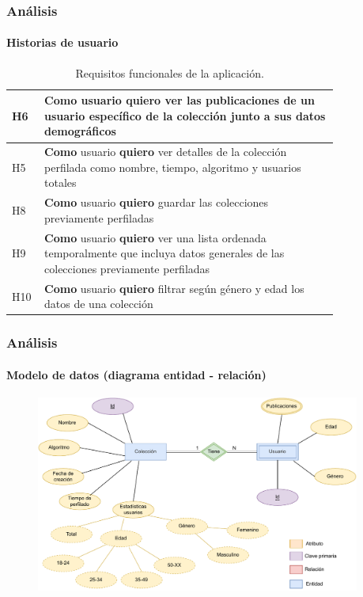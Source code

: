 \documentclass{beamer}
\begin{document}
	\begin{frame}
		\frametitle{Análisis}
		\framesubtitle{Historias de usuario}
		\begin{table}[H]
			{
				\setlength\arrayrulewidth{0.75pt}
				\setlength{\tabcolsep}{0.9\tabcolsep}
				
				\begin{tabular}{|p{0.04\linewidth} | p{0.78\linewidth}|}
					\hline
					
					H6 & \textbf{Como} usuario \textbf{quiero} ver las publicaciones de un usuario específico de la colección junto a sus datos demográficos\\ \hline
					H5 & \textbf{Como} usuario \textbf{quiero} ver detalles de la colección perfilada como nombre, tiempo, algoritmo y usuarios totales \\ \hline
					H8 & \textbf{Como} usuario \textbf{quiero} guardar las colecciones previamente perfiladas \\ \hline
					H9 & \textbf{Como} usuario \textbf{quiero} ver una lista ordenada temporalmente que incluya datos generales de las colecciones previamente perfiladas\\ \hline
					H10 & \textbf{Como} usuario \textbf{quiero} filtrar según género y edad los datos de una colección\\ \hline
					
					\end{tabular}
				}
			\caption{Requisitos funcionales de la aplicación.}
			\label{tab:user-stories}
		\end{table}
	\end{frame}

	\begin{frame}
		\frametitle{Análisis}
		\framesubtitle{Modelo de datos (diagrama entidad - relación)}
		\begin{figure}[H]
			\centering
			\includegraphics[width=0.95\textwidth]{ER-diagram.pdf}
			\label{fig:diagrama/ER}
		\end{figure}
	\end{frame}
\end{document}
